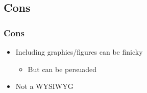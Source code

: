 \subsection{Cons}

\begin{frame}
\frametitle{Cons}
    \begin{itemize}
        \item Including graphics/figures can be finicky
        \begin{itemize}
            \item But can be persuaded
        \end{itemize}
        \item Not a WYSIWYG
    \end{itemize}
\end{frame}




